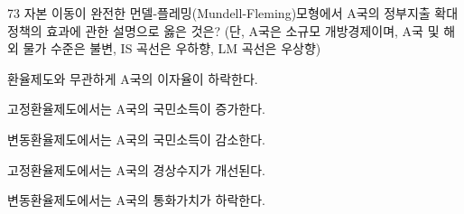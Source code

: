 \begin{question}{73}
자본 이동이 완전한 먼델-플레밍(Mundell-Fleming)모형에서 A국의 정부지출 확대 정책의 효과에 관한 설명으로 옳은 것은? (단, A국은 소규모 개방경제이며, A국 및 해외 물가 수준은 불변, IS 곡선은 우하향, LM 곡선은 우상향)
\begin{choices}
  \item 환율제도와 무관하게 A국의 이자율이 하락한다.
  \item 고정환율제도에서는 A국의 국민소득이 증가한다.
  \item 변동환율제도에서는 A국의 국민소득이 감소한다.
  \item 고정환율제도에서는 A국의 경상수지가 개선된다.
  \item 변동환율제도에서는 A국의 통화가치가 하락한다.
\end{choices}
\end{question}
